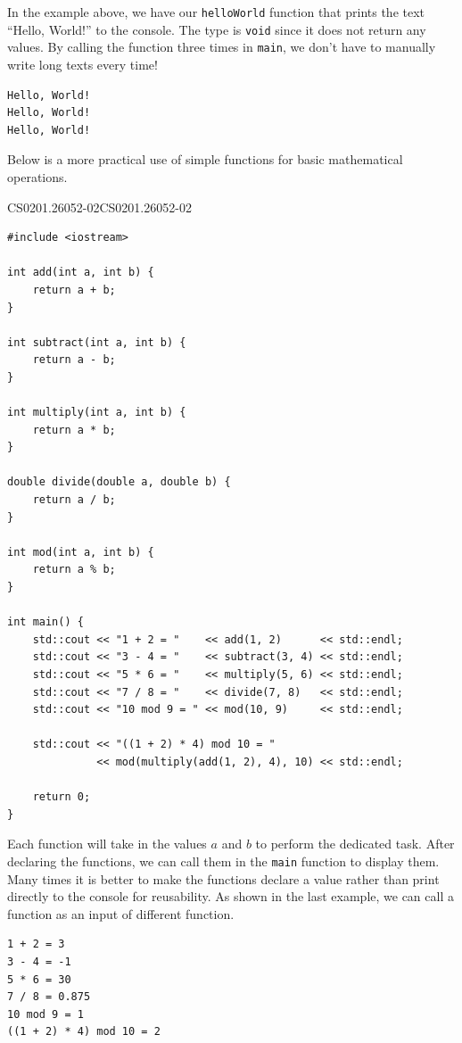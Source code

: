 \documentclass[../../main.tex]{subfiles}
\begin{document}
In the example above, we have our \verb|helloWorld| function that
prints the text ``Hello, World!'' to the console. The type is
\verb|void| since it does not return any values. By calling the
function three times in \verb|main|, we don't have to manually
write long texts every time!

\begin{outputbox}
\begin{lstlisting}[style=basic]
Hello, World!
Hello, World!
Hello, World!
\end{lstlisting}
\end{outputbox}

Below is a more practical use of simple functions for basic
mathematical operations.

\begin{cppbox}{CS0201.26052-02}{CS0201.26052-02}
\begin{lstlisting}[style=cppstyle]
#include <iostream>

int add(int a, int b) {
    return a + b;
}

int subtract(int a, int b) {
    return a - b;
}

int multiply(int a, int b) {
    return a * b;
}

double divide(double a, double b) {
    return a / b;
}

int mod(int a, int b) {
    return a % b;
}

int main() {
    std::cout << "1 + 2 = "    << add(1, 2)      << std::endl;
    std::cout << "3 - 4 = "    << subtract(3, 4) << std::endl;
    std::cout << "5 * 6 = "    << multiply(5, 6) << std::endl;
    std::cout << "7 / 8 = "    << divide(7, 8)   << std::endl;
    std::cout << "10 mod 9 = " << mod(10, 9)     << std::endl;

    std::cout << "((1 + 2) * 4) mod 10 = "
              << mod(multiply(add(1, 2), 4), 10) << std::endl;

    return 0;
}
\end{lstlisting}
\end{cppbox}

Each function will take in the values $a$ and $b$ to perform the
dedicated task. After declaring the functions, we can call them in
the \verb|main| function to display them. Many times it is better
to make the functions declare a value rather than print directly
to the console for reusability. As shown in the last example,
we can call a function as an input of different function.

\begin{outputbox}
\begin{lstlisting}[style=basic]
1 + 2 = 3
3 - 4 = -1
5 * 6 = 30
7 / 8 = 0.875
10 mod 9 = 1
((1 + 2) * 4) mod 10 = 2
\end{lstlisting}
\end{outputbox}
\end{document}
